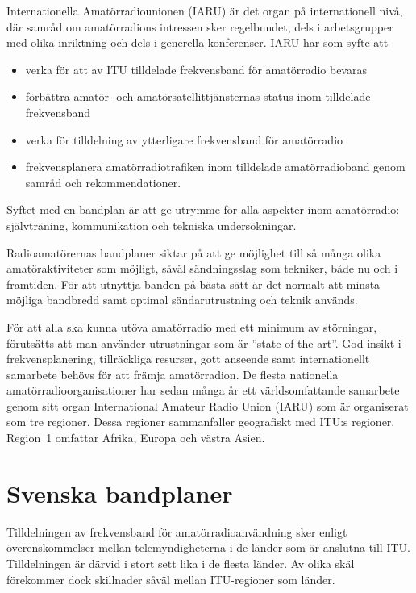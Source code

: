 Internationella Amatörradiounionen (IARU) är det organ på internationell
nivå, där samråd om amatörradions intressen sker regelbundet, dels i
arbetsgrupper med olika inriktning och dels i generella konferenser.
IARU har som syfte att

\begin{itemize}
  \item verka för att av ITU tilldelade frekvensband för amatörradio bevaras
  \item förbättra amatör- och amatörsatellittjänsternas status inom tilldelade
  frekvensband
  \item verka för tilldelning av ytterligare frekvensband för amatörradio
  \item frekvensplanera amatörradiotrafiken inom tilldelade amatörradioband
  genom samråd och rekommendationer.
\end{itemize}

Syftet med en bandplan är att ge utrymme för alla aspekter inom amatörradio:
självträning, kommunikation och tekniska undersökningar.

Radioamatörernas bandplaner siktar på att ge möjlighet till så många olika
amatöraktiviteter som möjligt, såväl sändningsslag som tekniker, både nu och i
framtiden.
För att utnyttja banden på bästa sätt är det normalt att minsta möjliga
bandbredd samt optimal sändarutrustning och teknik används.

För att alla ska kunna utöva amatörradio med ett minimum av störningar,
förutsätts att man använder utrustningar som är ''state of the art''.
God insikt i frekvensplanering, tillräckliga resurser, gott anseende samt
internationellt samarbete behövs för att främja amatörradion.
De flesta nationella amatörradioorganisationer har sedan många år ett
världsomfattande samarbete genom sitt organ International Amateur Radio Union
(IARU) som är organiserat som tre regioner.
Dessa regioner sammanfaller geografiskt med ITU:s regioner.
Region~1 omfattar Afrika, Europa och västra Asien.

\section{Svenska bandplaner}

Tilldelningen av frekvensband för amatörradioanvändning sker enligt
överenskommelser mellan telemyndigheterna i de länder som är anslutna till ITU.
Tilldelningen är därvid i stort sett lika i de flesta länder.
Av olika skäl förekommer dock skillnader såväl mellan ITU-regioner som länder.

